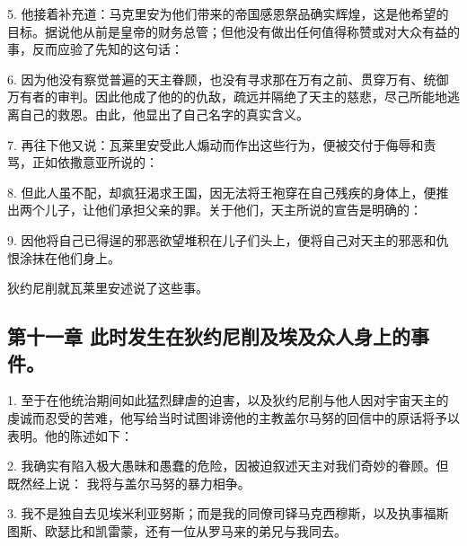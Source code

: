 5. 他接着补充道：马克里安为他们带来的帝国感恩祭品确实辉煌，这是他希望的目标。据说他从前是皇帝的财务总管；但他没有做出任何值得称赞或对大众有益的事，反而应验了先知的这句话：\par

6.   因为他没有察觉普遍的天主眷顾，也没有寻求那在万有之前、贯穿万有、统御万有者的审判。因此他成了他的的仇敌，疏远并隔绝了天主的慈悲，尽己所能地逃离自己的救恩。由此，他显出了自己名字的真实含义。\par

7. 再往下他又说：瓦莱里安受此人煽动而作出这些行为，便被交付于侮辱和责骂，正如依撒意亚所说的： \par

8. 但此人虽不配，却疯狂渴求王国，因无法将王袍穿在自己残疾的身体上，便推出两个儿子，让他们承担父亲的罪。关于他们，天主所说的宣告是明确的： \par

9. 因他将自己已得逞的邪恶欲望堆积在儿子们头上，便将自己对天主的邪恶和仇恨涂抹在他们身上。\par

狄约尼削就瓦莱里安述说了这些事。\par


\subsection{第十一章  此时发生在狄约尼削及埃及众人身上的事件。}

1. 至于在他统治期间如此猛烈肆虐的迫害，以及狄约尼削与他人因对宇宙天主的虔诚而忍受的苦难，他写给当时试图诽谤他的主教盖尔马努的回信中的原话将予以表明。他的陈述如下：\par

2. 我确实有陷入极大愚昧和愚蠢的危险，因被迫叙述天主对我们奇妙的眷顾。但既然经上说：  我将与盖尔马努的暴力相争。\par

3. 我不是独自去见埃米利亚努斯；而是我的同僚司铎马克西穆斯，以及执事福斯图斯、欧瑟比和凯雷蒙，还有一位从罗马来的弟兄与我同去。\par

